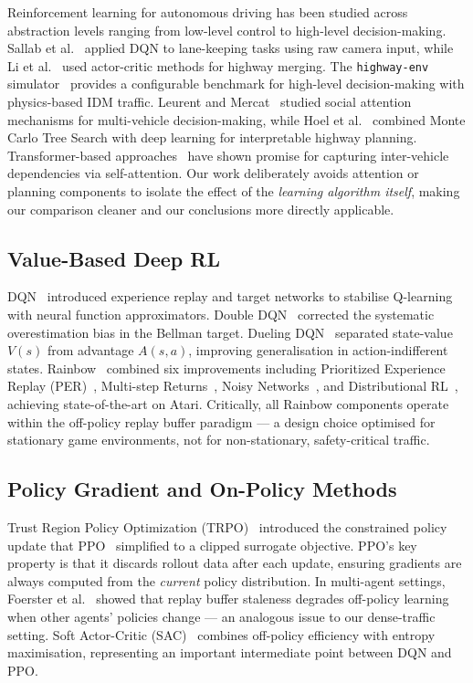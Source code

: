 \documentclass[conference]{IEEEtran}
\begin{document}
Reinforcement learning for autonomous driving has been studied across abstraction levels
ranging from low-level control to high-level decision-making. Sallab et
al.~\cite{sallab2017deep} applied DQN to lane-keeping tasks using raw camera input,
while Li et al.~\cite{li2019reinforcement} used actor-critic methods for highway merging.
The \texttt{highway-env} simulator~\cite{highway-env} provides a configurable benchmark
for high-level decision-making with physics-based IDM traffic.
Leurent and Mercat~\cite{leurent2018approximate} studied social attention mechanisms
for multi-vehicle decision-making, while Hoel et al.~\cite{hoel2022mcts} combined Monte
Carlo Tree Search with deep learning for interpretable highway planning.
Transformer-based approaches~\cite{transformerRL} have shown promise for capturing
inter-vehicle dependencies via self-attention. Our work deliberately avoids attention
or planning components to isolate the effect of the \emph{learning algorithm itself},
making our comparison cleaner and our conclusions more directly applicable.

\subsection{Value-Based Deep RL}

DQN~\cite{mnih2015human} introduced experience replay and target networks to stabilise
Q-learning with neural function approximators. Double DQN~\cite{van2016deep} corrected
the systematic overestimation bias in the Bellman target. Dueling
DQN~\cite{wang2016dueling} separated state-value $V(s)$ from advantage $A(s,a)$,
improving generalisation in action-indifferent states. Rainbow~\cite{hessel2018rainbow}
combined six improvements including Prioritized Experience Replay
(PER)~\cite{schaul2015prioritized}, Multi-step Returns~\cite{sutton2018rl},
Noisy Networks~\cite{fortunato2017noisy}, and Distributional
RL~\cite{bellemare2017distributional}, achieving state-of-the-art on Atari.
Critically, all Rainbow components operate within the off-policy replay buffer paradigm
--- a design choice optimised for stationary game environments, not for
non-stationary, safety-critical traffic.

\subsection{Policy Gradient and On-Policy Methods}

Trust Region Policy Optimization (TRPO)~\cite{schulman2015trust} introduced the
constrained policy update that PPO~\cite{schulman2017proximal} simplified to a clipped
surrogate objective. PPO's key property is that it discards rollout data after each
update, ensuring gradients are always computed from the \emph{current} policy
distribution. In multi-agent settings, Foerster et al.~\cite{foerster2017stabilising}
showed that replay buffer staleness degrades off-policy learning when other agents'
policies change --- an analogous issue to our dense-traffic setting.
Soft Actor-Critic (SAC)~\cite{haarnoja2018soft} combines off-policy efficiency with
entropy maximisation, representing an important intermediate point between DQN and PPO.
\end{document}

